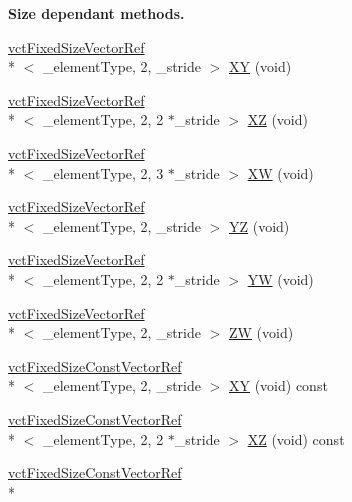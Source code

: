 \begin{Indent}{\bf Size dependant methods.}
\begin{DoxyCompactItemize}
\item 
\hyperlink{classvct_fixed_size_vector_ref}{vct\-Fixed\-Size\-Vector\-Ref}\\*
$<$ \-\_\-element\-Type, 2, \-\_\-stride $>$ \hyperlink{classvct_fixed_size_vector_base_a3cb4fec662953c304a5bc691f529b0c0}{X\-Y} (void)
\item 
\hyperlink{classvct_fixed_size_vector_ref}{vct\-Fixed\-Size\-Vector\-Ref}\\*
$<$ \-\_\-element\-Type, 2, 2 $\ast$\-\_\-stride $>$ \hyperlink{classvct_fixed_size_vector_base_a5a193eb98d206de74e52c7ffd5757c70}{X\-Z} (void)
\item 
\hyperlink{classvct_fixed_size_vector_ref}{vct\-Fixed\-Size\-Vector\-Ref}\\*
$<$ \-\_\-element\-Type, 2, 3 $\ast$\-\_\-stride $>$ \hyperlink{classvct_fixed_size_vector_base_a333d923e6e87c199796f8eeaad809505}{X\-W} (void)
\item 
\hyperlink{classvct_fixed_size_vector_ref}{vct\-Fixed\-Size\-Vector\-Ref}\\*
$<$ \-\_\-element\-Type, 2, \-\_\-stride $>$ \hyperlink{classvct_fixed_size_vector_base_a82a58b3aa2db78a60d6e5de9a5bfeaee}{Y\-Z} (void)
\item 
\hyperlink{classvct_fixed_size_vector_ref}{vct\-Fixed\-Size\-Vector\-Ref}\\*
$<$ \-\_\-element\-Type, 2, 2 $\ast$\-\_\-stride $>$ \hyperlink{classvct_fixed_size_vector_base_a5a87c05d9495660bee668139d75a9fc5}{Y\-W} (void)
\item 
\hyperlink{classvct_fixed_size_vector_ref}{vct\-Fixed\-Size\-Vector\-Ref}\\*
$<$ \-\_\-element\-Type, 2, \-\_\-stride $>$ \hyperlink{classvct_fixed_size_vector_base_afa1d2613e918c447722ea8e12d2019ee}{Z\-W} (void)
\item 
\hyperlink{classvct_fixed_size_const_vector_ref}{vct\-Fixed\-Size\-Const\-Vector\-Ref}\\*
$<$ \-\_\-element\-Type, 2, \-\_\-stride $>$ \hyperlink{classvct_fixed_size_vector_base_a465e544ec88842a0f0b77e100c8cdce6}{X\-Y} (void) const 
\item 
\hyperlink{classvct_fixed_size_const_vector_ref}{vct\-Fixed\-Size\-Const\-Vector\-Ref}\\*
$<$ \-\_\-element\-Type, 2, 2 $\ast$\-\_\-stride $>$ \hyperlink{classvct_fixed_size_vector_base_a1647c63974e92dc246763f5dfc3bc285}{X\-Z} (void) const 
\item 
\hyperlink{classvct_fixed_size_const_vector_ref}{vct\-Fixed\-Size\-Const\-Vector\-Ref}\\*

\end{DoxyCompactItemize}
\end{Indent}
